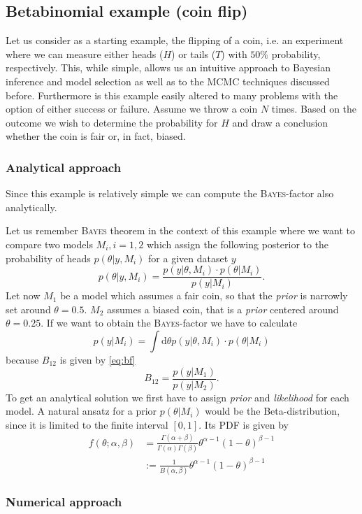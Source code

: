 \documentclass[%
 reprint,
 amsmath,amssymb,
 aps,
]{revtex4-1}
\begin{document}
\subsection{Betabinomial example (coin flip)}
Let us consider as a starting example, the flipping of a coin, i.e. an experiment where we can measure either heads ($H$) or tails ($T$) with $50\%$ probability, respectively. This, while simple, allows us an intuitive approach to Bayesian inference and model selection as well as to the MCMC techniques discussed before. Furthermore is this example easily altered to many problems with the option of either success or failure. Assume we throw a coin $N$ times. Based on the outcome we wish to determine the probability for $H$ and draw a conclusion whether the coin is fair or, in fact, biased.
\subsubsection{Analytical approach}
Since this example is relatively simple we can compute the \textsc{Bayes}-factor also analytically.


Let us remember \textsc{Bayes} theorem in the context of this example where we want to compare two models $M_i,i=1,2$ which assign the following posterior to the probability of heads $p(\theta|y,M_i)$ for a given dataset $y$
$$p(\theta|y,M_i)=\frac{p(y|\theta,M_i)\cdot p(\theta|M_i)}{p(y|M_i)}.$$
Let now $M_1$ be a model which assumes a fair coin, so that the \emph{prior} is narrowly set around $\theta=0.5$. $M_2$ assumes a biased coin, that is a \emph{prior} centered around $\theta =0.25$. If we want to obtain the \textsc{Bayes}-factor we have to calculate $$p(y|M_i)=\int \text{d}\theta p(y|\theta,M_i)\cdot p(\theta|M_i) $$
because $B_{12}$ is given by \eqref{eq:bf} $$B_{12}=\frac{p(y|M_1)}{p(y|M_2)}.$$
To get an analytical solution we first have to assign \emph{prior} and \emph{likelihood} for each model. A natural ansatz for a prior $p(\theta|M_i)$ would be the Beta-distribution, since it is limited to the finite interval $[0,1]$. Its PDF is given by \cite{kormaz} \begin{align*}f(\theta;\alpha,\beta)&=\frac{\Gamma(\alpha+\beta)}{\Gamma(\alpha)\Gamma(\beta)}\theta^{\alpha-1}(1-\theta)^{\beta-1}\\&:=\frac{1}{B(\alpha,\beta)}\theta^{\alpha-1}(1-\theta)^{\beta-1}
\end{align*}
\subsubsection{Numerical approach}
\end{document}
